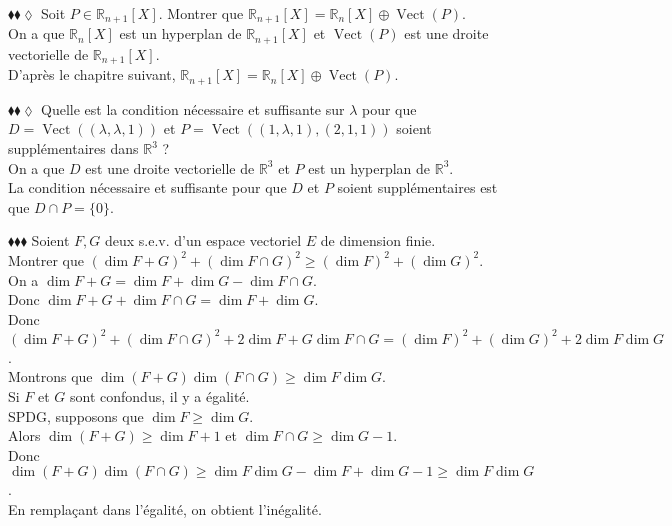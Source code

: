 \documentclass[11pt]{article}
\newcommand*{\R}{\mathbb{R}}
\DeclareMathOperator*{\vect}{Vect}
\begin{document}
\begin{exercise}{$\blacklozenge\blacklozenge\lozenge$}{}
    Soit $P \in \R_{n+1}[X]$. Montrer que $\R_{n+1}[X] = \R_n[X] \oplus \vect(P)$.
    \tcblower\\[0.2cm]
    On a que $\R_n[X]$ est un hyperplan de $\R_{n+1}[X]$ et $\vect(P)$ est une droite vectorielle de $\R_{n+1}[X]$.\\
    D'après le chapitre suivant, $\R_{n+1}[X] = \R_n[X] \oplus \vect(P)$.
\end{exercise}

\begin{exercise}{$\blacklozenge\blacklozenge\lozenge$}{}
    Quelle est la condition nécessaire et suffisante sur $\lambda$ pour que $D = \vect((\lambda, \lambda, 1))$ et $P = \vect((1, \lambda, 1), (2, 1, 1))$ soient supplémentaires dans $\R^3$ ?
    \tcblower\\[0.2cm]
    On a que $D$ est une droite vectorielle de $\R^3$ et $P$ est un hyperplan de $\R^3$.\\
    La condition nécessaire et suffisante pour que $D$ et $P$ soient supplémentaires est que $D \cap P = \{0\}$.
\end{exercise}

\begin{exercise}{$\blacklozenge\blacklozenge\blacklozenge$}{}
    Soient $F,G$ deux s.e.v. d'un espace vectoriel $E$ de dimension finie.\\
    Montrer que $(\dim F + G)^2 + (\dim F \cap G)^2 \geq (\dim F)^2 + (\dim G)^2$.
    \tcblower\\[0.2cm]
    On a $\dim F+G = \dim F + \dim G - \dim F \cap G$.\\
    Donc $\dim F+G + \dim F \cap G = \dim F + \dim G$.\\
    Donc $(\dim F+G)^2 + (\dim F \cap G)^2 + 2\dim F + G \dim F \cap G = (\dim F)^2 + (\dim G)^2 + 2\dim F \dim G$.\\
    Montrons que $\dim(F+G)\dim(F \cap G) \geq \dim F \dim G$.\\
    Si $F$ et $G$ sont confondus, il y a égalité.\\
    SPDG, supposons que $\dim F \geq \dim G$.\\
    Alors $\dim(F + G) \geq \dim F + 1$ et $\dim F \cap G \geq \dim G - 1$.\\
    Donc $\dim(F + G)\dim(F \cap G) \geq \dim F \dim G - \dim F + \dim G - 1 \geq \dim F \dim G$.\\
    En remplaçant dans l'égalité, on obtient l'inégalité.
\end{exercise}
\end{document}
